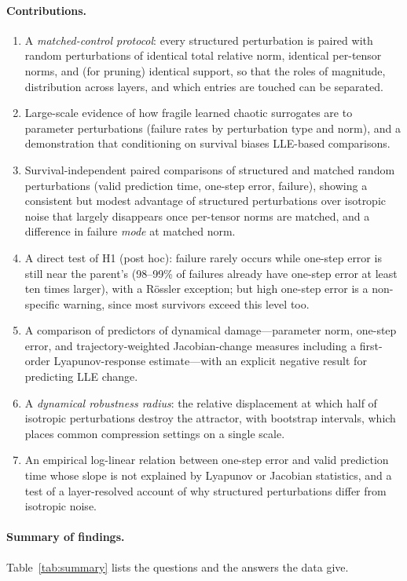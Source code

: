 \documentclass[11pt]{article}
\begin{document}
\paragraph{Contributions.}
\begin{enumerate}
\item A \emph{matched-control protocol}: every structured perturbation is paired with random perturbations of identical total relative norm, identical per-tensor norms, and (for pruning) identical support, so that the roles of magnitude, distribution across layers, and which entries are touched can be separated.
\item Large-scale evidence of how fragile learned chaotic surrogates are to parameter perturbations (failure rates by perturbation type and norm), and a demonstration that conditioning on survival biases LLE-based comparisons.
\item Survival-independent paired comparisons of structured and matched random perturbations (valid prediction time, one-step error, failure), showing a consistent but modest advantage of structured perturbations over isotropic noise that largely disappears once per-tensor norms are matched, and a difference in failure \emph{mode} at matched norm.
\item A direct test of H1 (post hoc): failure rarely occurs while one-step error is still near the parent's (98--99\% of failures already have one-step error at least ten times larger), with a R\"ossler exception; but high one-step error is a non-specific warning, since most survivors exceed this level too.
\item A comparison of predictors of dynamical damage---parameter norm, one-step error, and trajectory-weighted Jacobian-change measures including a first-order Lyapunov-response estimate---with an explicit negative result for predicting LLE change.
\item A \emph{dynamical robustness radius}: the relative displacement at which half of isotropic perturbations destroy the attractor, with bootstrap intervals, which places common compression settings on a single scale.
\item An empirical log-linear relation between one-step error and valid prediction time whose slope is not explained by Lyapunov or Jacobian statistics, and a test of a layer-resolved account of why structured perturbations differ from isotropic noise.
\end{enumerate}

\paragraph{Summary of findings.} Table~\ref{tab:summary} lists the questions and the answers the data give.
\end{document}
